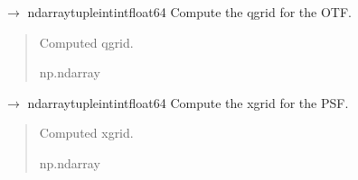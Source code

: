 \documentclass[letterpaper,10pt,english]{sphinxmanual}
\begin{document}
\begin{fulllineitems}
\begin{fulllineitems}
\label{\detokenize{source/OpticalSystems:OpticalSystems.OpticalSystem2D.compute_q_grid}}
\pysigstartsignatures
\pysiglinewithargsret
{}
{}
{{ $\rightarrow$ ndarray\DUrole{p}{{[}}tuple\DUrole{p}{{[}}intint\DUrole{p}{{]}}float64\DUrole{p}{{]}}}}
\pysigstopsignatures
\sphinxAtStartPar
Compute the q\sphinxhyphen{}grid for the OTF.
\begin{quote}\begin{description}
\sphinxAtStartPar
Computed q\sphinxhyphen{}grid.

\sphinxAtStartPar
np.ndarray

\end{description}\end{quote}

\end{fulllineitems}


\begin{fulllineitems}
\label{\detokenize{source/OpticalSystems:OpticalSystems.OpticalSystem2D.compute_x_grid}}
\pysigstartsignatures
\pysiglinewithargsret
{}
{}
{{ $\rightarrow$ ndarray\DUrole{p}{{[}}tuple\DUrole{p}{{[}}intint\DUrole{p}{{]}}float64\DUrole{p}{{]}}}}
\pysigstopsignatures
\sphinxAtStartPar
Compute the x\sphinxhyphen{}grid for the PSF.
\begin{quote}\begin{description}
\sphinxAtStartPar
Computed x\sphinxhyphen{}grid.

\sphinxAtStartPar
np.ndarray

\end{description}\end{quote}

\end{fulllineitems}



\end{fulllineitems}
\end{document}
